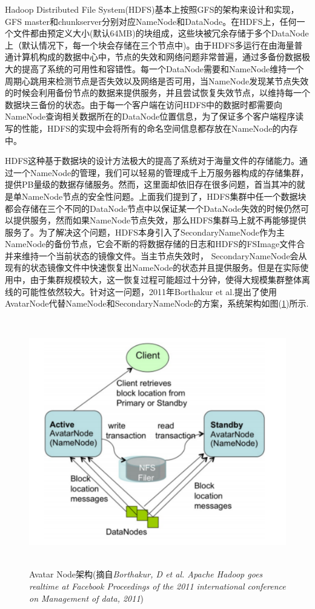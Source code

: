 Hadoop Distributed File System(HDFS)基本上按照GFS的架构来设计和实现，GFS master和chunkserver分别对应NameNode和DataNode。在HDFS上，任何一个文件都由预定义大小(默认64MB)的块组成，这些块被冗余存储于多个DataNode上（默认情况下，每一个块会存储在三个节点中)。由于HDFS多运行在由海量普通计算机构成的数据中心中，节点的失效和网络问题非常普遍，通过多备份数据极大的提高了系统的可用性和容错性。每一个DataNode需要和NameNode维持一个周期心跳用来检测节点是否失效以及网络是否可用，当NameNode发现某节点失效的时候会利用备份节点的数据来提供服务，并且尝试恢复失效节点，以维持每一个数据块三备份的状态。由于每一个客户端在访问HDFS中的数据时都需要向NameNode查询相关数据所在的DataNode位置信息，为了保证多个客户端程序读写的性能，HDFS的实现中会将所有的命名空间信息都存放在NameNode的内存中。

HDFS这种基于数据块的设计方法极大的提高了系统对于海量文件的存储能力。通过一个NameNode的管理，我们可以轻易的管理成千上万服务器构成的存储集群，提供PB量级的数据存储服务。然而，这里面却依旧存在很多问题，首当其冲的就是单NameNode节点的安全性问题。上面我们提到了，HDFS集群中任一个数据块都会存储在三个不同的DataNode节点中以保证某一个DataNode失效的时候仍然可以提供服务，然而如果NameNode节点失效，那么HDFS集群马上就不再能够提供服务了。为了解决这个问题，HDFS本身引入了SecondaryNameNode作为主NameNode的备份节点，它会不断的将数据存储的日志和HDFS的FSImage文件合并来维持一个当前状态的镜像文件。当主节点失效时， SecondaryNameNode会从现有的状态镜像文件中快速恢复出NameNode的状态并且提供服务。但是在实际使用中，由于集群规模较大，这一恢复过程可能超过十分钟，使得大规模集群整体离线的可能性依然较大。针对这一问题，2011年Borthakur et al.提出了使用AvatarNode代替NameNode和SecondaryNameNode的方案，系统架构如图(\ref{fig:avatar})所示.

\begin{figure}[]
\centering
\includegraphics[height=4.25in]{../figures/avatarfb.pdf}
\caption{Avatar Node架构(摘自\textit{Borthakur, D et al. Apache Hadoop goes realtime at Facebook Proceedings of the 2011 international conference on Management of data, 2011})}
\label{fig:avatar}
\end{figure}

